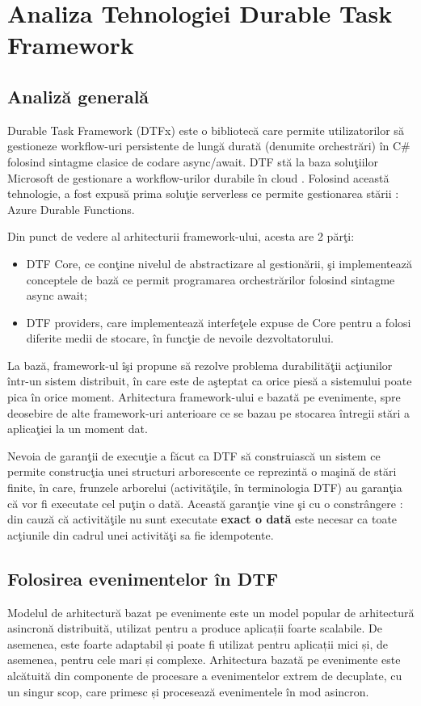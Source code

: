 \chapter{Analiza Tehnologiei Durable Task Framework }
\section{Analiză generală}
\quad Durable Task Framework (DTFx) este o bibliotecă care permite utilizatorilor să gestioneze workflow-uri persistente de lungă durată (denumite orchestrări) în C\# folosind sintagme clasice de codare async/await. DTF stă la baza soluţiilor Microsoft de gestionare a workflow-urilor durabile în cloud . Folosind această tehnologie, a fost expusă prima soluţie serverless ce permite gestionarea stării : Azure Durable Functions. 
\par Din punct de vedere al arhitecturii framework-ului, acesta are 2 părţi:
\begin{itemize} 
\item DTF Core, ce conţine nivelul de abstractizare al gestionării, şi implementează conceptele de bază ce permit programarea orchestrărilor folosind sintagme async await;
\item DTF providers, care implementează interfeţele expuse de Core pentru a folosi diferite medii de stocare, în funcţie de nevoile dezvoltatorului. 
\end{itemize} 
\par La bază, framework-ul îşi propune să rezolve problema durabilităţii acţiunilor într-un sistem distribuit, în care este de aşteptat ca orice piesă a sistemului poate pica în orice moment. Arhitectura framework-ului e bazată pe evenimente, spre deosebire de alte framework-uri anterioare ce se bazau pe stocarea întregii stări a aplicaţiei la un moment dat. 
\par Nevoia de garanţii de execuţie a făcut ca DTF să construiască un sistem ce permite construcţia unei structuri arborescente ce reprezintă o maşină de stări finite, în care, frunzele arborelui (activităţile, în terminologia DTF) au garanţia că vor fi executate cel puţin o dată. Această garanţie vine şi cu o constrângere : din cauză că activităţile nu sunt executate \textbf{exact o dată} este necesar ca toate acţiunile din cadrul unei activităţi sa fie idempotente. 
\section{Folosirea evenimentelor în DTF}
\quad Modelul de arhitectură bazat pe evenimente este un model popular de arhitectură asincronă distribuită, utilizat pentru a produce aplicații foarte scalabile. De asemenea, este foarte adaptabil și poate fi utilizat pentru aplicații mici și, de asemenea, pentru cele mari și complexe. Arhitectura bazată pe evenimente este alcătuită din componente de procesare a evenimentelor extrem de decuplate, cu un singur scop, care primesc și procesează evenimentele în mod asincron.

